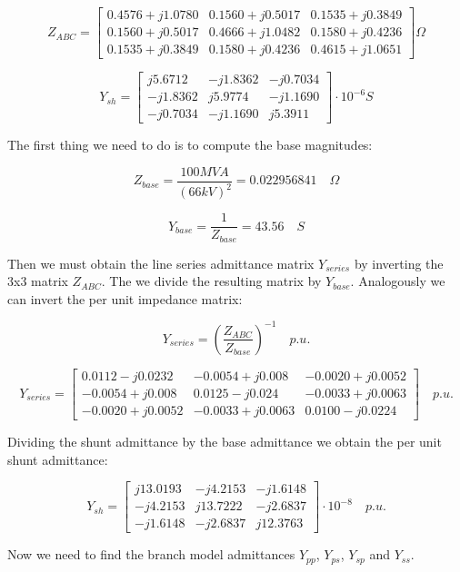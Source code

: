 \documentclass[nols,a4paper,twoside,notoc,fleqn]{tufte-book}
\begin{document}
$$
Z_{ABC} = \left[ \begin{array}{ccc}
0.4576 + j 1.0780 & 0.1560 + j0 .5017 & 0.1535 + j 0.3849 \\
0.1560 + j 0.5017 & 0.4666 + j 1.0482 & 0.1580 + j 0.4236 \\ 
0.1535 + j 0.3849 & 0.1580 + j 0.4236 & 0.4615 + j 1.0651
\end{array} \right] \Omega
$$

$$
Y_{sh} = \left[ \begin{array}{ccc}
j5.6712 & -j1.8362 & -j0.7034 \\
-j1.8362 & j5.9774 & -j1.1690 \\ 
-j0.7034 & -j1.1690 & j5.3911
\end{array} \right] \cdot 10^{-6}  S
$$

The first thing we need to do is to compute the base magnitudes:

$$
Z_{base} = \frac{100 MVA}{(66kV)^2} = 0.022956841 \quad \Omega
$$

$$
Y_{base} = \frac{1}{Z_{base}} = 43.56 \quad S
$$

Then we must obtain the line series admittance matrix $Y_{series}$ by inverting the 3x3 matrix $Z_{ABC}$. The we divide the resulting matrix by $Y_{base}$. Analogously we can invert the per unit impedance matrix:

$$
Y_{series} = \left(\frac{Z_{ABC}}{Z_{base}}\right)^{-1} \quad p.u.
$$

$$
Y_{series} = \left[ \begin{array}{ccc}
0.0112-j0.0232  & -0.0054+j0.008   & -0.0020+j0.0052 \\ -0.0054+j0.008  &  0.0125-j0.024 & -0.0033+j0.0063 \\ -0.0020+j0.0052 &  -0.0033+j0.0063 & 0.0100-j0.0224
\end{array} \right]\quad  p.u.
$$

Dividing the shunt admittance by the base admittance we obtain the per unit shunt admittance:

$$
Y_{sh} = \left[ \begin{array}{ccc}
j13.0193 & -j4.2153 &  -j1.6148 \\
-j4.2153 & j13.7222 & -j2.6837 \\ 
-j1.6148 & -j2.6837 & j12.3763
\end{array} \right] \cdot 10^{-8}  \quad p.u.
$$

Now we need to find the branch model admittances $Y_{pp}$, $Y_{ps}$, $Y_{sp}$ and $Y_{ss}$.
\end{document}
